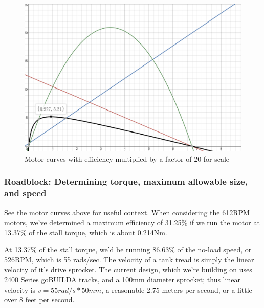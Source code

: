 \documentclass[a4paper, 10pt]{article}
\begin{document}
		\begin{figure} [!h]
			\centering
			\includegraphics[scale=0.5]{motor_curves_118}
			\caption{Motor curves with efficiency multiplied by a factor of 20 for scale}
			\label{motor_curves_118}
		\end{figure}
		
		\subsubsection{Roadblock: Determining torque, maximum allowable size, and speed}
		See the motor curves above for useful context. When considering the 612RPM motors, we've determined a maximum efficiency of 31.25\% if we run the motor at 13.37\% of the stall torque, which is about 0.214Nm. 
		
		At 13.37\% of the stall torque, we'd be running 86.63\% of the no-load speed, or 526RPM, which is 55 rads/sec. The velocity of a tank tread is simply the linear velocity of it's drive sprocket. The current design, which we're building on uses 2400 Series goBUILDA tracks, and a 100mm diameter sprocket; thus linear velocity is $v = 55rad/s * 50mm$, a reasonable 2.75 meters per second, or a little over 8 feet per second. 
		
\end{document}
